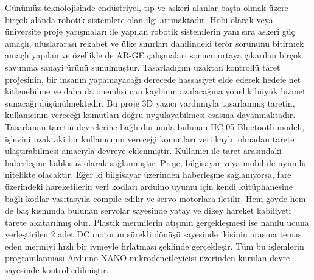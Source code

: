 
\label{CH:BolumGiris}

Günümüz teknolojisinde endüstriyel, tıp ve askeri alanlar başta olmak üzere birçok alanda robotik sistemlere olan ilgi artmaktadır. Hobi olarak veya üniversite proje yarışmaları ile yapılan robotik sistemlerin yanı sıra askeri güç amaçlı, uluslararası rekabet ve ülke sınırları dahilindeki terör sorununu bitirmek amaçlı yapılan ve özellikle de AR-GE çalışmaları sonucu ortaya çıkarılan birçok savunma sanayi ürünü sunulmuştur. Tasarladığım uzaktan kontrollü taret projesinin, bir insanın yapamayacağı derecede hassasiyet elde ederek hedefe net kitlenebilme ve daha da önemlisi can kaybının azalacağına yönelik büyük hizmet sunacağı düşünülmektedir. Bu proje 3D yazıcı yardımıyla tasarlanmış taretin, kullanıcının vereceği komutları doğru uygulayabilmesi esasına dayanmaktadır. Tasarlanan taretin devrelerine bağlı durumda bulunan HC-05 Bluetooth modeli, işlevini uzaktaki bir kullanıcının vereceği komutları veri kaybı olmadan tarete ulaştırabilmesi amacıyla devreye eklenmiştir. Kullanıcı ile taret arasındaki haberleşme kablosuz olarak sağlanmıştır. Proje, bilgisayar veya mobil ile uyumlu nitelikte olacaktır.  Eğer ki bilgisayar üzerinden haberleşme sağlanıyorsa, fare üzerindeki hareketilerin veri kodları arduino uyumu için  kendi kütüphanesine bağlı kodlar vasıtasyıla compile edilir ve servo motorlara iletilir. Hem gövde hem de baş kısmında bulunan servolar sayesinde yatay ve dikey hareket kabiliyeti tarete akatarılmış olur. Plastik mermilerin atışının gerçekleşmesi ise namlu ucuna yerleştirilen 2 adet DC motorun sürekli dönüşü sayesinde ikisinin arasına temas eden mermiyi hızlı bir ivmeyle fırlatması şeklinde gerçekleşir. Tüm bu işlemlerin programlanması Arduino NANO mikrodenetleyicisi üzerinden kurulan devre sayesinde kontrol edilmiştir.

\clearpage